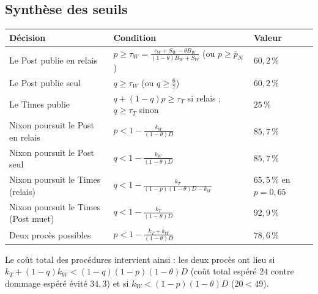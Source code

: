 \documentclass[11pt,a4paper]{article}
\theoremstyle{definition}
\begin{document}
\subsection{Synthèse des seuils}
\begin{center}
\small
\begin{tabular}{@{}lll@{}}
\toprule
Décision & Condition & Valeur \\
\midrule
Le Post publie en relais & $p\ge\tau_W=\frac{c_W+S_W-\theta B_W}{(1-\theta)B_W+S_W}$ (ou $p\ge\bar p_N$) & $60,2\,\%$ \\
Le Post publie seul & $q\ge\tau_W$ (ou $q\ge\frac67$) & $60,2\,\%$ \\
Le Times publie & $q+(1-q)p\ge\tau_T$ si relais ; $q\ge\tau_T$ sinon & $25\,\%$ \\
Nixon poursuit le Post en relais & $p<1-\frac{k_W}{(1-\theta)D}$ & $85,7\,\%$ \\
Nixon poursuit le Post seul & $q<1-\frac{k_W}{(1-\theta)D}$ & $85,7\,\%$ \\
Nixon poursuit le Times (relais) & $q<1-\frac{k_T}{(1-p)(1-\theta)D-k_W}$ & $65,5\,\%$ en $p=0,65$ \\
Nixon poursuit le Times (Post muet) & $q<1-\frac{k_T}{(1-\theta)D}$ & $92,9\,\%$ \\
Deux procès possibles & $p<1-\frac{k_T+k_W}{(1-\theta)D}$ & $78,6\,\%$ \\
\bottomrule
\end{tabular}
\end{center}
Le coût total des procédures intervient ainsi : les deux procès ont lieu si $k_T+(1-q)k_W<(1-q)(1-p)(1-\theta)D$ (coût total espéré $24$ contre dommage espéré évité $34,3$) et si $k_W<(1-p)(1-\theta)D$ ($20<49$).
\end{document}
